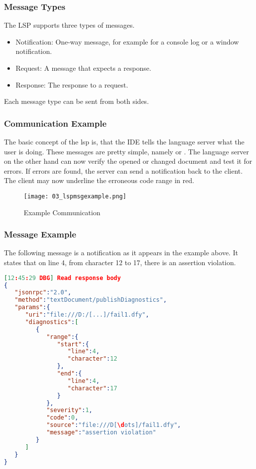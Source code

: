 \subsubsection{Message Types}
The LSP supports three types of messages.
\begin{itemize}
    \item Notification: One-way message, for example for a console log or a window notification.
    \item Request: A message that expects a response.
    \item Response: The response to a request.
\end{itemize}
Each message type can be sent from both sides.

\subsubsection{Communication Example}
The basic concept of the lsp is, that the IDE tells the language server what the user is doing. These messages are pretty simple, namely  or . The language server on the other hand can now verify the opened or changed document and test it for errors. If errors are found, the server can send a  notification back to the client. The client may now underline the erroneous code range in red. \cite{lspspec}

\begin{figure}[h]
    \centering
    \texttt{[image: 03\_lspmsgexample.png]}
    \caption{Example Communication}
    \label{fig:lspmsgexample}
\end{figure}

\subsubsection{Message Example}
The following message is a  notification as it appears in the example above. It states that on line 4, from character 12 to 17, there is an assertion violation.\\


\begin{lstlisting}[language=json, caption={LSP Message Example}, captionpos=b, label={lst:lspjsonmsg}]
[12:45:29 DBG] Read response body 
{ 
   "jsonrpc":"2.0",
   "method":"textDocument/publishDiagnostics",
   "params":{ 
      "uri":"file:///D:/[...]/fail1.dfy",
      "diagnostics":[ 
         { 
            "range":{ 
               "start":{ 
                  "line":4,
                  "character":12
               },
               "end":{ 
                  "line":4,
                  "character":17
               }
            },
            "severity":1,
            "code":0,
            "source":"file:///D[\dots]/fail1.dfy",
            "message":"assertion violation"
         }
      ]
   }
}
\end{lstlisting}

